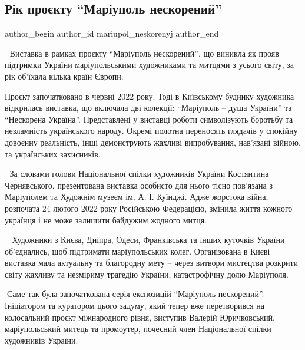  
 
 
 
 

\subsection{Рік проєкту \enquote{Маріуполь нескорений}}
\label{sec:02_08_2023.fb.mariupol_neskorenyj.1.rik_proektu_mariupol_neskorenyj}

\ifcmt
 author_begin
   author_id mariupol_neskorenyj
 author_end
\fi

📎 Виставка в рамках проєкту \enquote{Маріуполь нескорений}, що виникла як прояв
підтримки України маріупольськими художниками та митцями з усього світу, за рік
об’їхала кілька країн Європи.

Проєкт започатковано в червні 2022 року. Тоді в Київському будинку художника
відкрилась виставка, що включала дві колекції: \enquote{Маріуполь – душа
України} та \enquote{Нескорена Україна}. Представлені у виставці роботи
символізують боротьбу та незламність українського народу. Окремі полотна
переносять глядачів у спокійну довоєнну реальність, інші демонструють жахливі
випробування, нав'язані війною, та українських захисників.

📑 За словами голови Національної спілки художників України Костянтина
Чернявського, презентована виставка особисто для нього тісно пов'язана з
Маріуполем та Художнім музеєм ім. А. І. Куїнджі. Адже жорстока війна,
розпочата 24 лютого 2022 року Російською Федерацією, змінила життя кожного
українця і не може залишити байдужим жодного митця.

👨🎨 Художники з Києва, Дніпра, Одеси, Франківська та інших куточків України
об’єднались, щоб підтримати маріупольських колег. Організована в Києві виставка
мала актуальну та благородну мету – через витвори мистецтва розкрити світу
жахливу та незміриму трагедію України, катастрофічну долю Маріуполя.

👏Саме так була започаткована серія експозицій \enquote{Маріуполь нескорений}.
Ініціатором та куратором  цього задуму, який тепер вже перетворився на
колосальний проєкт міжнародного рівня, виступив Валерій Юричковський,
маріупольський митець та промоутер, почесний член Національної спілки
художників України.

